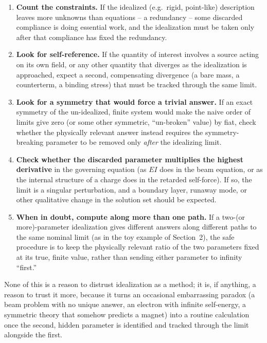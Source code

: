 \begin{enumerate}
\item \textbf{Count the constraints.} If the idealized (e.g.\
    rigid, point-like) description leaves more unknowns than
        equations -- a redundancy -- some discarded compliance
        is doing essential work, and the idealization must be
        taken only after that compliance has fixed the
        redundancy.
\item \textbf{Look for self-reference.} If the quantity of
    interest involves a source acting on its own field, or any
        other quantity that diverges as the idealization is
        approached, expect a second, compensating divergence (a
        bare mass, a counterterm, a binding stress) that must be
        tracked through the same limit.
\item \textbf{Look for a symmetry that would force a trivial
    answer.} If an exact symmetry of the un-idealized, finite
        system would make the naive order of limits give zero
        (or some other symmetric, ``un-broken'' value) by fiat,
        check whether the physically relevant answer instead
        requires the symmetry-breaking parameter to be removed
        only \emph{after} the idealizing limit.
\item \textbf{Check whether the discarded parameter multiplies
    the highest derivative} in the governing equation (as $EI$
        does in the beam equation, or as the internal structure
        of a charge does in the retarded self-force). If so, the
        limit is a singular perturbation, and a boundary layer,
        runaway mode, or other qualitative change in the
        solution set should be expected.
\item \textbf{When in doubt, compute along more than one path.}
    If a two-(or more)-parameter idealization gives different
        answers along different paths to the same nominal limit
        (as in the toy example of Section~2), the safe procedure
        is to keep the physically relevant ratio of the two
        parameters fixed at its true, finite value, rather than
        sending either parameter to infinity ``first.''
\end{enumerate}

None of this is a reason to distrust idealization as a method;
it is, if anything, a reason to trust it more, because it turns
an occasional embarrassing paradox (a beam problem with no
unique answer, an electron with infinite self-energy, a
symmetric theory that somehow predicts a magnet) into a routine
calculation once the second, hidden parameter is identified and
tracked through the limit alongside the first.


